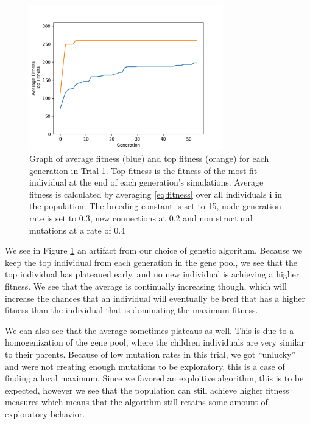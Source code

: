 \documentclass{article}
\begin{document}
\begin{figure}[h]\label{fig:fitness graph}
\centering
\includegraphics[width=0.75\textwidth]{fig_1}
\begin{changemargin}{0.15in}{0.15in}
  \caption{Graph of average fitness (blue) and top fitness (orange) for each
    generation in Trial 1. Top fitness is the fitness of the most fit individual
    at the end of each generation's simulations. Average fitness is calculated
    by averaging \eqref{eq:fitness} over all individuals $\bm{i}$ in the
    population. The breeding constant is set to 15, node generation rate is set
    to 0.3, new connections at 0.2 and non structural mutations at a rate of
    0.4}
\end{changemargin}
\end{figure}

We see in Figure \ref{fig:fitness graph} an artifact from our choice of genetic
algorithm. Because we keep the top individual from each generation in the gene
pool, we see that the top individual has plateaued early, and no new individual
is achieving a higher fitness. We see that the average is continually increasing
though, which will increase the chances that an individual will eventually be
bred that has a higher fitness than the individual that is dominating the
maximum fitness.

We can also see that the average sometimes plateaus as well. This is due to a
homogenization of the gene pool, where the children individuals are very
similar to their parents. Because of low mutation rates in this trial, we got
``unlucky'' and were not creating enough mutations to be exploratory, this is a
case of finding a local maximum. Since we favored an exploitive algorithm, this
is to be expected, however we see that the population can still achieve higher
fitness measures which means that the algorithm still retains some amount of
exploratory behavior.
\end{document}
